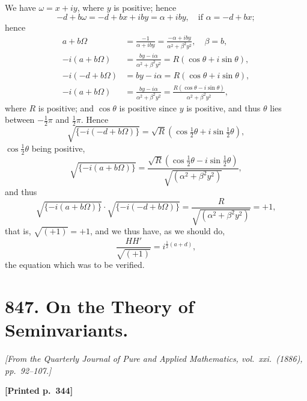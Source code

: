 \documentclass[11pt]{article}
\begin{document}
We have $\omega = x + iy$, where $y$ is positive; hence
\[
-d + b\omega = -d + bx + iby = \alpha + iby,\quad \text{if } \alpha = -d + bx;
\]
hence
\begin{align*}
a + b\Omega &= \frac{-1}{\alpha + iby} = \frac{-\alpha + iby}{\alpha^{2} + \beta^{2}y^{2}},\quad \beta = b, \\
-i(a + b\Omega) &= \frac{by - i\alpha}{\alpha^{2} + \beta^{2}y^{2}} = R(\cos\theta + i\sin\theta), \\
-i(-d + b\Omega) &= by - i\alpha = R(\cos\theta + i\sin\theta), \\
-i(a + b\Omega) &= \frac{by - i\alpha}{\alpha^{2} + \beta^{2}y^{2}} = \frac{R(\cos\theta - i\sin\theta)}{\alpha^{2} + \beta^{2}y^{2}},
\end{align*}
where $R$ is positive; and $\cos\theta$ is positive since $y$ is positive, and thus $\theta$ lies between $-\tfrac{1}{2}\pi$ and $\tfrac{1}{2}\pi$. Hence
\[
\sqrt{\{-i(-d + b\Omega)\}} = \sqrt{R}(\cos\tfrac{1}{2}\theta + i\sin\tfrac{1}{2}\theta),
\]
$\cos\tfrac{1}{2}\theta$ being positive,
\[
\sqrt{\{-i(a + b\Omega)\}} = \frac{\sqrt{R}(\cos\tfrac{1}{2}\theta - i\sin\tfrac{1}{2}\theta)}{\sqrt{(\alpha^{2} + \beta^{2}y^{2})}},
\]
and thus
\[
\sqrt{\{-i(a + b\Omega)\}}\cdot\sqrt{\{-i(-d + b\Omega)\}} = \frac{R}{\sqrt{(\alpha^{2} + \beta^{2}y^{2})}} = +1,
\]
that is, $\sqrt{(+1)} = +1$, and we thus have, as we should do,
\[
\frac{HH'}{\sqrt{(+1)}} = i^{\frac{1}{2}(a + d)},
\]
the equation which was to be verified.

\newpage


\section*{847. On the Theory of Seminvariants.}

\noindent\textit{[From the Quarterly Journal of Pure and Applied Mathematics, vol.~xxi.\ (1886), pp.~92--107.]}

\medskip

\noindent\textbf{[Printed p.~344]}\hfill
\end{document}
